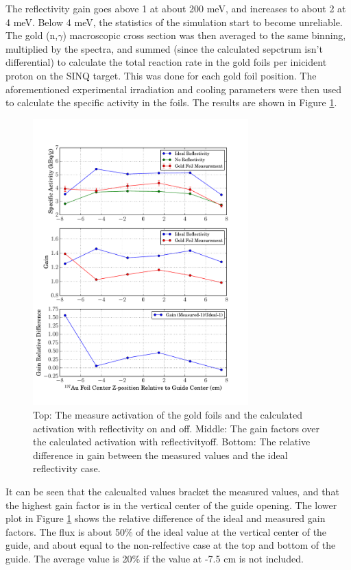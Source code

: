 \documentclass[a4paper,
              ]{jacow}
\begin{document}
The reflectivity gain goes above 1 at about 200 meV, and increases to about 2 at 4 meV.  Below 4 meV, the statistics of the simulation start to become unreliable.  The gold (n,$\gamma$) macroscopic cross section was then averaged to the same binning, multiplied by the spectra, and summed (since the calculated sepctrum isn't differential) to calculate the total reaction rate in the gold foils per inicident proton on the SINQ target.  This was done for each gold foil position.  The aforementioned experimental irradiation and cooling parameters were then used to calculate the specific activity in the foils.  The results are shown in Figure \ref{activation}.

\begin{figure}[!htb]
   \centering
   \includegraphics*[trim = 0mm 5mm 15mm 25mm, width=83mm]{graphics/GF_act.pdf}
   \caption{Top: The measure activation of the gold foils and the calculated activation with reflectivity on and off.  Middle:  The gain factors over the calculated activation with reflectivityoff.  Bottom:  The relative difference in gain between the measured values and the ideal reflectivity case.}
   \label{activation}
\end{figure}

It can be seen that the calcualted values bracket the measured values, and that the highest gain factor is in the vertical center of the guide opening.  The lower plot in Figure \ref{activation} shows the relative difference of the ideal and measured gain factors.  The flux is about 50\% of the ideal value at the vertical center of the guide, and about equal to the non-relfective case at the top and bottom of the guide.  The average value is 20\% if the value at -7.5 cm is not included.
\end{document}
